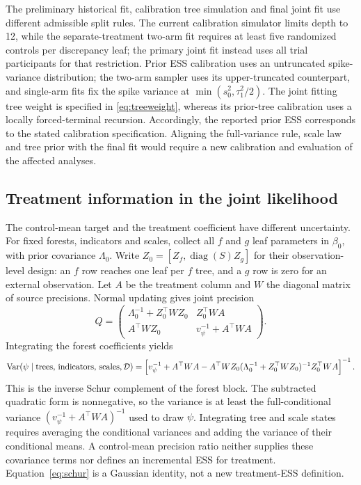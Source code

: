 The preliminary historical fit, calibration tree simulation and final joint fit use different admissible split rules. The current calibration simulator limits depth to 12, while the separate-treatment two-arm fit requires at least five randomized controls per discrepancy leaf; the primary joint fit instead uses all trial participants for that restriction. Prior ESS calibration uses an untruncated spike-variance distribution; the two-arm sampler uses its upper-truncated counterpart, and single-arm fits fix the spike variance at $\min(s_0^2,\tau_1^2/2)$. The joint fitting tree weight is specified in \eqref{eq:treeweight}, whereas its prior-tree calibration uses a locally forced-terminal recursion. Accordingly, the reported prior ESS corresponds to the stated calibration specification. Aligning the full-variance rule, scale law and tree prior with the final fit would require a new calibration and evaluation of the affected analyses.

\subsection{Treatment information in the joint likelihood}\label{sec:B.8}
The control-mean target and the treatment coefficient have different uncertainty. For fixed forests, indicators and scales, collect all $f$ and $g$ leaf parameters in $\beta_0$, with prior covariance $\Lambda_0$. Write $Z_0=[Z_f,\operatorname{diag}(S)Z_g]$ for their observation-level design: an $f$ row reaches one leaf per $f$ tree, and a $g$ row is zero for an external observation. Let $A$ be the treatment column and $W$ the diagonal matrix of source precisions. Normal updating gives joint precision
\[
Q=\begin{pmatrix}
\Lambda_0^{-1}+Z_0^\top WZ_0&Z_0^\top WA\\
A^\top WZ_0&v_\psi^{-1}+A^\top WA
\end{pmatrix}.
\]
Integrating the forest coefficients yields
\begin{equation}\label{eq:schur}
\operatorname{Var}(\psi\mid\text{trees, indicators, scales},\mathcal D)
=\left[v_\psi^{-1}+A^\top WA
-A^\top WZ_0(\Lambda_0^{-1}+Z_0^\top WZ_0)^{-1}Z_0^\top WA\right]^{-1}.
\end{equation}
This is the inverse Schur complement of the forest block. The subtracted quadratic form is nonnegative, so the variance is at least the full-conditional variance $(v_\psi^{-1}+A^\top WA)^{-1}$ used to draw $\psi$. Integrating tree and scale states requires averaging the conditional variances and adding the variance of their conditional means. A control-mean precision ratio neither supplies these covariance terms nor defines an incremental ESS for treatment. Equation~\eqref{eq:schur} is a Gaussian identity, not a new treatment-ESS definition.


